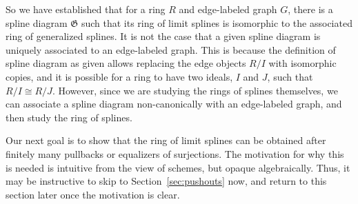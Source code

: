 \documentclass{article}
\begin{document}
So we have established that for a ring $R$ and edge-labeled graph $G$, there is a spline diagram $\mathfrak G$ such that its ring of limit splines is isomorphic to the associated ring of generalized splines. It is not the case that a given spline diagram is uniquely associated to an edge-labeled graph. This is because the definition of spline diagram as given allows replacing the edge objects $R/I$ with isomorphic copies, and it is possible for a ring to have two ideals, $I$ and $J$, such that $R/I \cong R/J$. However, since we are studying the rings of splines themselves, we can associate a spline diagram non-canonically with an edge-labeled graph, and then study the ring of splines.

Our next goal is to show that the ring of limit splines can be obtained after finitely many pullbacks or equalizers of surjections. The motivation for why this is needed is intuitive from the view of schemes, but opaque algebraically. Thus, it may be instructive to skip to Section~\ref{sec:pushouts} now, and return to this section later once the motivation is clear.
\end{document}
